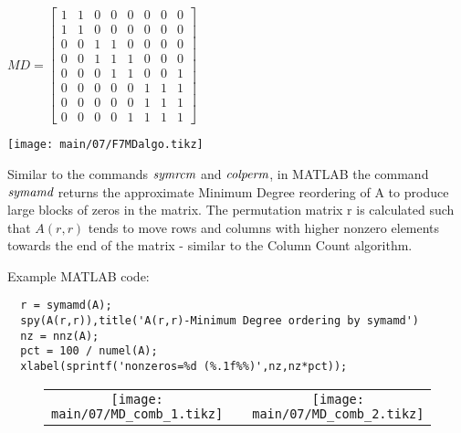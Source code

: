     \begin{minipage}[]{0.50\linewidth}
      \begin{center}
        $MD=
        \begin{bmatrix}
          1 & 1 & 0 & 0 & 0 & 0 & 0 & 0 \\
          1 & 1 & 0 & 0 & 0 & 0 & 0 & 0 \\
          0 & 0 & 1 & 1 & 0 & 0 & 0 & 0 \\
          0 & 0 & 1 & 1 & 1 & 0 & 0 & 0 \\
          0 & 0 & 0 & 1 & 1 & 0 & 0 & 1 \\
          0 & 0 & 0 & 0 & 0 & 1 & 1 & 1 \\
          0 & 0 & 0 & 0 & 0 & 1 & 1 & 1 \\
          0 & 0 & 0 & 0 & 1 & 1 & 1 & 1
        \end{bmatrix}$
      \end{center}
    \end{minipage}
    \begin{minipage}[]{0.49\linewidth}
      \begin{center}
      \texttt{[image: main/07/F7MDalgo.tikz]}
      \end{center}
    \end{minipage}
  
  Similar to the commands $\emph{symrcm}$ and $\emph{colperm}$, in MATLAB the
  command $\emph{symamd}$ returns the approximate Minimum Degree reordering of A
  to produce large blocks of zeros in the matrix. The permutation matrix r is
  calculated such that $A(r,r)$ tends to move rows and columns with higher nonzero
  elements towards the end of the matrix - similar to the Column Count algorithm.
  
  Example MATLAB code:
  {%
  \begin{lstlisting}
  r = symamd(A);
  spy(A(r,r)),title('A(r,r)-Minimum Degree ordering by symamd')
  nz = nnz(A);
  pct = 100 / numel(A);
  xlabel(sprintf('nonzeros=%d (%.1f%%)',nz,nz*pct));
  \end{lstlisting}}
  \begin{figure}[H]
    \begin{center}
      \scriptsize
      \begin{tabular}{ccc}
        \texttt{[image: main/07/MD\_comb\_1.tikz]}
        &&
        \texttt{[image: main/07/MD\_comb\_2.tikz]}
      \end{tabular}
    \end{center}
  \end{figure}
  
